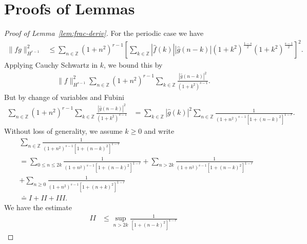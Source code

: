 \documentclass[12pt,reqno]{amsart}
\numberwithin{equation}{section}  %
\numberwithin{figure}{section}
\newcommand{\zz}{\mathbb{Z}}
\newcommand{\wh}{\widehat}
\begin{document}
\section{Proofs of Lemmas} 
\label{sec:pf-lemmas}
%
%
%
\begin{proof}[Proof of Lemma~\ref{lem:frac-deriv}]
For the periodic case we have
%
%
\begin{equation*}
\begin{split}
\| fg\|_{H^{r-1}}^{2}
& \le  \sum_{n \in \zz}  (1 + n^{2})^{r-1}\left [ \sum_{k \in \zz}
| \wh{f}(k) |  | \wh{g}(n - k) | (1 +
k^{2})^{\frac{1-s}{2}} (1 + k^{2})^{\frac{s-1}{2}}
\right ]^{2}.
\end{split}
\end{equation*}
%
Applying Cauchy Schwartz in $k$, we bound this by
%
%
%
\begin{equation}
\label{np-key-term}
\begin{split}
\| f \|_{H^{s-1}}^{2} \sum_{n \in \zz}  (1 + n^{2})^{r-1}\sum_{k \in \zz} \frac{|
\wh{g}(n - k) |^{2}}{(1 + k^{2})^{s-1}}.
\end{split}
\end{equation}
%
But by change of variables and Fubini
%
\begin{equation}
\label{opp}
\begin{split}
\sum_{n \in \zz}  (1 + n^{2})^{r-1}\sum_{k \in \zz} \frac{|
\wh{g}(n - k) |^{2}}{(1 + k^{2})^{s-1}}
& = \sum_{k \in \zz}| \wh{g}(k) |^{2} \sum_{n \in \zz}  
\frac{1}{(1 + n^{2})^{s-1}[1 + (n - k)^{2}]^{1-r}}.  
\end{split}
\end{equation}
%
Without loss of generality, we assume $k \ge 0$ and write 
\begin{equation*}
\begin{split}
&  \sum_{n \in \zz}  
\frac{1}{(1 + n^{2})^{s-1}[1 + (n - k)^{2}]^{1-r}}  
\\
& = 
\sum_{0 \le n \le 2k} \frac{1}{(1 + n^{2})^{s-1}[1 + (n - k)^{2}]^{1-r}} 
+ \sum_{n > 2k} \frac{1}{(1 + n^{2})^{s-1}[1 + (n - k)^{2}]^{1-r}}
\\
& + \sum_{n \ge 0} \frac{1}{(1 + n^{2})^{s-1}[1 + (n + k)^{2}]^{1-r}} 
\\
& \doteq I + II + III.
\end{split} 
\end{equation*}
%
We have the estimate
%
%
\begin{equation}
\label{est-tem}
\begin{split}
II 
& \le \sup_{n > 2k} \frac{1}{\left[ 1 + (n-k)^{2} \right]^{1-r}}

\end{split}
\end{equation}
\end{proof}
\end{document}
